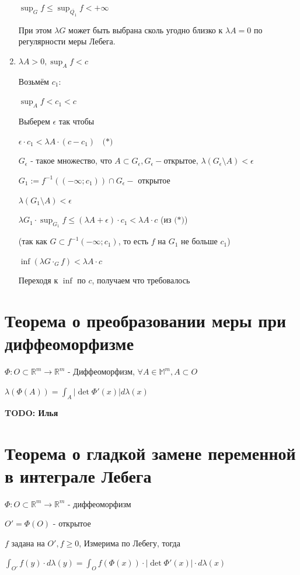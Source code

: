 \documentclass[paper=a4, fontsize=17pt]{article}
\begin{document}
\begin{enumerate}
	$\sup_G f \leqslant \sup_{\overline{Q_1}} f < + \infty$

	При этом $\lambda G$ может быть выбрана сколь угодно близко к $\lambda A = 0$ по регулярности меры Лебега.

	\item $\lambda A > 0, \sup_A f < c$

	Возьмём $c_1$:

	$\sup_A f < c_1 < c$

	Выберем $\epsilon$ так чтобы

	$\epsilon \cdot c_1 < \lambda A \cdot (c - c_1) ~~~~ \textbf{(*)}$

	$G_{\epsilon}$ - такое множество, что $A \subset G_{\epsilon}, G_{\epsilon}-$открытое, $\lambda(G_{\epsilon} \setminus A) < \epsilon$

	$G_1 := f^{-1}((- \infty; c_1)) \cap G_{\epsilon} - $ открытое

	$\lambda(G_1 \setminus A) < \epsilon$

	$\lambda G_1 \cdot \sup_{G_1} f \leqslant (\lambda A + \epsilon) \cdot c_1 < \lambda A \cdot c$ (из $\textbf{(*)}$)

	(так как $G \subset f^{-1}(- \infty; c_1)$, то есть $f$ на $G_1$ не больше $c_1$)

	$\inf(\lambda G \cdot_G f) < \lambda A \cdot c$

	Переходя к $\inf$ по $c$, получаем что требовалось
\end{enumerate}

\section{Теорема о преобразовании меры при диффеоморфизме}
$\Phi: O \subset \mathds{R}^m \rightarrow \mathds{R}^m$ - Диффеоморфизм, $\forall A \in \mathds{M}^m, A \subset O$

$\lambda(\Phi(A)) = \int_A |\det \Phi' (x)| d \lambda(x)$

\textbf{TODO: Илья}

\section{Теорема о гладкой замене переменной в интеграле Лебега}
$\Phi: O \subset \mathds{R}^m \rightarrow \mathds{R}^m$ - диффеоморфизм

$O' = \Phi(O)$ - открытое

$f$ задана на $O', f \geqslant 0$, Измерима по Лебегу, тогда

$\int_{O'}f(y) \cdot d \lambda(y) = \int_O f(\Phi(x)) \cdot |\det \Phi'(x)| \cdot d \lambda(x)$
\end{document}

